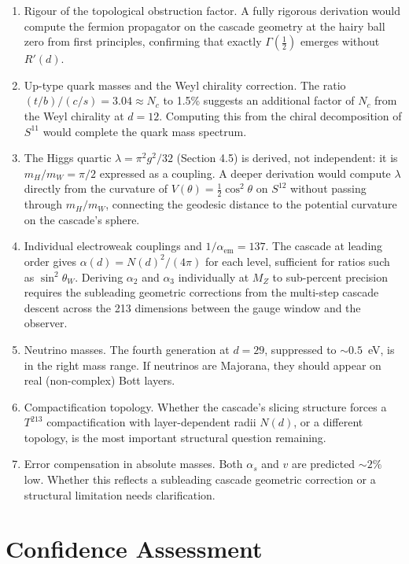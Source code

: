 \documentclass[12pt,a4paper]{article}
\begin{document}
\begin{enumerate}
\item Rigour of the topological obstruction factor. A fully rigorous derivation would compute the fermion propagator on the cascade geometry at the hairy ball zero from first principles, confirming that exactly $\Gamma(\tfrac{1}{2})$ emerges without $R'(d)$.
\item Up-type quark masses and the Weyl chirality correction. The ratio $(t/b)/(c/s) = 3.04 \approx N_c$ to 1.5\% suggests an additional factor of $N_c$ from the Weyl chirality at $d = 12$. Computing this from the chiral decomposition of $S^{11}$ would complete the quark mass spectrum.
\item The Higgs quartic $\lambda = \pi^2 g^2/32$ (Section 4.5) is derived, not independent: it is $m_H/m_W = \pi/2$ expressed as a coupling. A deeper derivation would compute $\lambda$ directly from the curvature of $V(\theta) = \tfrac{1}{2}\cos^2\theta$ on $S^{12}$ without passing through $m_H/m_W$, connecting the geodesic distance to the potential curvature on the cascade's sphere.
\item Individual electroweak couplings and $1/\alpha_{\text{em}} = 137$. The cascade at leading order gives $\alpha(d) = N(d)^2/(4\pi)$ for each level, sufficient for ratios such as $\sin^2\theta_W$. Deriving $\alpha_2$ and $\alpha_3$ individually at $M_Z$ to sub-percent precision requires the subleading geometric corrections from the multi-step cascade descent across the 213 dimensions between the gauge window and the observer.
\item Neutrino masses. The fourth generation at $d = 29$, suppressed to $\sim 0.5$~eV, is in the right mass range. If neutrinos are Majorana, they should appear on real (non-complex) Bott layers.
\item Compactification topology. Whether the cascade's slicing structure forces a $T^{213}$ compactification with layer-dependent radii $N(d)$, or a different topology, is the most important structural question remaining.
\item Error compensation in absolute masses. Both $\alpha_s$ and $v$ are predicted $\sim 2\%$ low. Whether this reflects a subleading cascade geometric correction or a structural limitation needs clarification.
\end{enumerate}

\section{Confidence Assessment}
\end{document}
